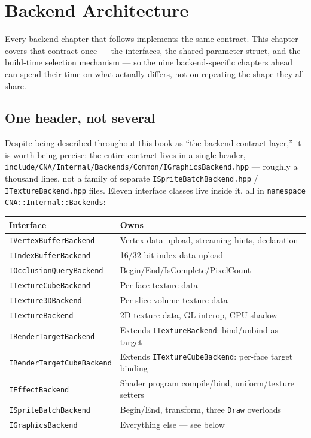 \chapter{Backend Architecture}
\label{ch:backend-architecture}

Every backend chapter that follows implements the same contract. This chapter covers that
contract once --- the interfaces, the shared parameter struct, and the build-time selection
mechanism --- so the nine backend-specific chapters ahead can spend their time on what
actually differs, not on repeating the shape they all share.

\section{One header, not several}

Despite  being described throughout this book as ``the backend
contract layer,'' it is worth being precise: the entire contract lives in a single header,
\texttt{include/\allowbreak{}CNA/\allowbreak{}Internal/\allowbreak{}Backends/\allowbreak{}Common/\allowbreak{}IGraphicsBackend.hpp} --- roughly a thousand
lines, not a family of separate \texttt{ISpriteBatchBackend.hpp} / \texttt{ITextureBackend.hpp}
files. Eleven interface classes live inside it, all in
\texttt{namespace CNA::Internal::Backends}:

\begin{center}
\begin{tabular}{ll}
\toprule
\textbf{Interface} & \textbf{Owns} \\
\midrule
\texttt{IVertexBufferBackend} & Vertex data upload, streaming hints, declaration \\
\texttt{IIndexBufferBackend} & 16/32-bit index data upload \\
\texttt{IOcclusionQueryBackend} & Begin/End/IsComplete/PixelCount \\
\texttt{ITextureCubeBackend} & Per-face texture data \\
\texttt{ITexture3DBackend} & Per-slice volume texture data \\
\texttt{ITextureBackend} & 2D texture data, GL interop, CPU shadow \\
\texttt{IRenderTargetBackend} & Extends \texttt{ITextureBackend}: bind/unbind as target \\
\texttt{IRenderTargetCubeBackend} & Extends \texttt{ITextureCubeBackend}: per-face target binding \\
\texttt{IEffectBackend} & Shader program compile/bind, uniform/texture setters \\
\texttt{ISpriteBatchBackend} & Begin/End, transform, three \texttt{Draw} overloads \\
\texttt{IGraphicsBackend} & Everything else --- see below \\
\bottomrule
\end{tabular}
\end{center}

